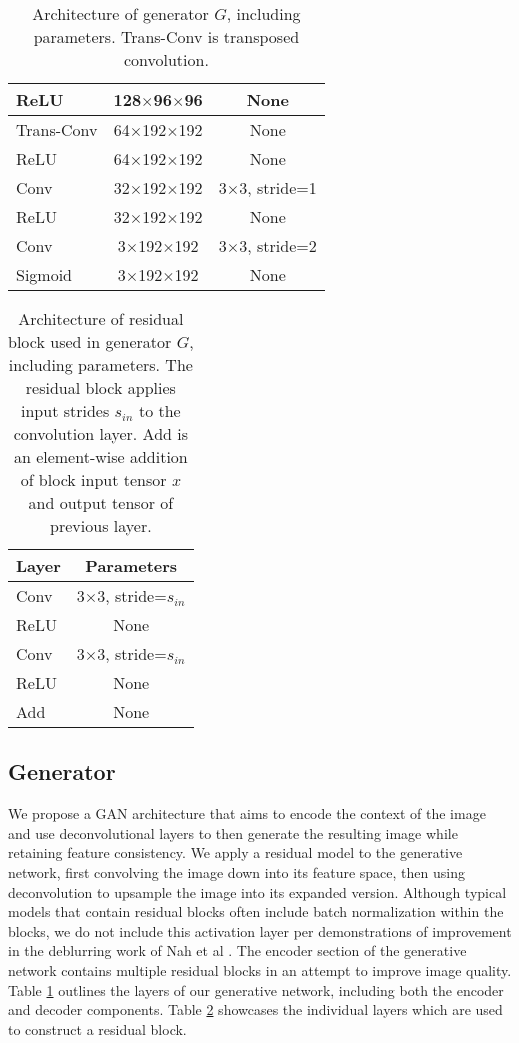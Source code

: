 \documentclass{article}
\begin{document}
\begin{table}[h]
\begin{tabular}{lcc}
    \hline
      ReLU & 128$\times$96$\times$96 & None \\
    \hline
      Trans-Conv & 64$\times$192$\times$192 & None \\
    \hline
      ReLU & 64$\times$192$\times$192 & None \\
    \hline
      Conv & 32$\times$192$\times$192 & 3$\times$3, stride=1 \\
    \hline
      ReLU & 32$\times$192$\times$192 & None \\
    \hline
      Conv & 3$\times$192$\times$192 & 3$\times$3, stride=2 \\
    \hline
      Sigmoid & 3$\times$192$\times$192 & None \\
    \hline
    \end{tabular}
  
  \caption{Architecture of generator $G$, including parameters. Trans-Conv is transposed convolution.} 
  \label{tab:1} 
\end{table}

\begin{table}[h] 
  \centering  
    \begin{tabular}{lc}  
    \hline
    \textbf{Layer} & \textbf{Parameters}\\ 
    \hline \hline
      Conv & 3$\times$3, stride=$s_{in}$ \\
    \hline
      ReLU & None \\
    \hline
      Conv & 3$\times$3, stride=$s_{in}$ \\
    \hline
      ReLU & None \\
    \hline
      Add & None \\
    \hline
    \end{tabular}
  
  \caption{Architecture of residual block used in generator $G$, including parameters. The residual block applies input strides $s_{in}$ to the convolution layer. Add is an element-wise addition of block input tensor $x$ and output tensor of previous layer.} 
  \label{tab:2}
\end{table}

\subsection{Generator}
We propose a GAN architecture that aims to encode the context of the image and use deconvolutional layers to then generate the resulting image while retaining feature consistency. We apply a residual model to the generative network, first convolving the image down into its feature space, then using deconvolution to upsample the image into its expanded version. Although typical models that contain residual blocks often include batch normalization within the blocks, we do not include this activation layer per demonstrations of improvement in the deblurring work of Nah et al \citep{nah_deep_2018}. The encoder section of the generative network contains multiple residual blocks in an attempt to improve image quality. Table \ref{tab:1} outlines the layers of our generative network, including both the encoder and decoder components. Table \ref{tab:2} showcases the individual layers which are used to construct a residual block.
\end{document}
